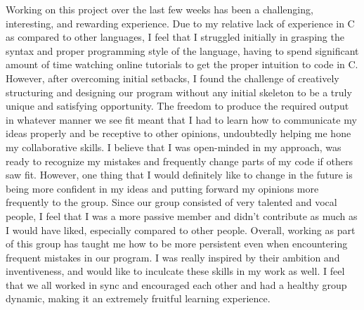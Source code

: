 \documentclass[11pt, letterpaper]{article}
\begin{document}
\begin{enumerate}
Working on this project over the last few weeks has been a challenging, interesting, and rewarding experience. Due to my relative lack of experience in C as compared to other languages, I feel that I struggled initially in grasping the syntax and proper programming style of the language, having to spend significant amount of time watching online tutorials to get the proper intuition to code in C. However, after overcoming initial setbacks, I found the challenge of creatively structuring and designing our program without any initial skeleton to be a truly unique and satisfying opportunity. The freedom to produce the required output in whatever manner we see fit meant that I had to learn how to communicate my ideas properly and be receptive to other opinions, undoubtedly helping me hone my collaborative skills. I believe that I was open-minded in my approach, was ready to recognize my mistakes and frequently change parts of my code if others saw fit. However, one thing that I would definitely like to change in the future is being more confident in my ideas and putting forward my opinions more frequently to the group. Since our group consisted of very talented and vocal people, I feel that I was a more passive member and didn't contribute as much as I would have liked, especially compared to other people. Overall, working as part of this group has taught me how to be more persistent even when encountering frequent mistakes in our program. I was really inspired by their ambition and inventiveness, and would like to inculcate these skills in my work as well. I feel that we all worked in sync and encouraged each other and had a healthy group dynamic, making it an extremely fruitful learning experience.

\end{enumerate}
\end{document}
